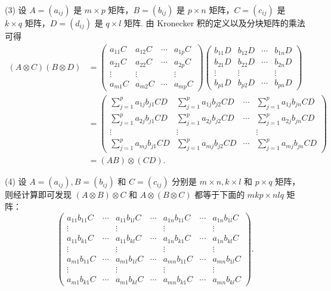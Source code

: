 \documentclass[UTF8,12pt,a4paper,fontset=fandol]{ctexart}
\begin{document}
(3) 设 $A=(a_{ij})$ 是 $m\times p$ 矩阵，$B=(b_{ij})$ 是 $p\times n$ 矩阵，$C=(c_{ij})$ 是 $k\times q$ 矩阵，$D=(d_{ij})$ 是 $q\times l$ 矩阵. 由 Kronecker 积的定义以及分块矩阵的乘法可得
\[
\begin{aligned}
(A\otimes C)(B\otimes D)
&=
\begin{pmatrix}
a_{11}C&a_{12}C&\cdots&a_{1p}C\\
a_{21}C&a_{22}C&\cdots&a_{2p}C\\
\vdots&\vdots&&\vdots\\
a_{m1}C&a_{m2}C&\cdots&a_{mp}C
\end{pmatrix}
\begin{pmatrix}
b_{11}D&b_{12}D&\cdots&b_{1n}D\\
b_{21}D&b_{22}D&\cdots&b_{2n}D\\
\vdots&\vdots&&\vdots\\
b_{p1}D&b_{p2}D&\cdots&b_{pn}D
\end{pmatrix}  \\
&=
\begin{pmatrix}
\sum_{j=1}^p a_{1j}b_{j1}CD&\sum_{j=1}^p a_{1j}b_{j2}CD&\cdots&\sum_{j=1}^p a_{1j}b_{jn}CD\\
\sum_{j=1}^p a_{2j}b_{j1}CD&\sum_{j=1}^p a_{2j}b_{j2}CD&\cdots&\sum_{j=1}^p a_{2j}b_{jn}CD\\
\vdots&\vdots&&\vdots\\
\sum_{j=1}^p a_{mj}b_{j1}CD&\sum_{j=1}^p a_{mj}b_{j2}CD&\cdots&\sum_{j=1}^p a_{mj}b_{jn}CD
\end{pmatrix}  \\
&=(AB)\otimes(CD).
\end{aligned}
\]

(4) 设 $A=(a_{ij}),B=(b_{ij})$ 和 $C=(c_{ij})$ 分别是 $m\times n,k\times l$ 和 $p\times q$ 矩阵，则经计算即可发现 $(A\otimes B)\otimes C$ 和 $A\otimes(B\otimes C)$ 都等于下面的 $mkp\times nlq$ 矩阵：
\[
\begin{pmatrix}
a_{11}b_{11}C&\cdots&a_{11}b_{1l}C&\cdots&a_{1n}b_{11}C&\cdots&a_{1n}b_{1l}C\\
\vdots&&\vdots&&\vdots&&\vdots\\
a_{11}b_{k1}C&\cdots&a_{11}b_{kl}C&\cdots&a_{1n}b_{k1}C&\cdots&a_{1n}b_{kl}C\\
\vdots&&\vdots&&\vdots&&\vdots\\
a_{m1}b_{11}C&\cdots&a_{m1}b_{1l}C&\cdots&a_{mn}b_{11}C&\cdots&a_{mn}b_{1l}C\\
\vdots&&\vdots&&\vdots&&\vdots\\
a_{m1}b_{k1}C&\cdots&a_{m1}b_{kl}C&\cdots&a_{mn}b_{k1}C&\cdots&a_{mn}b_{kl}C
\end{pmatrix}.
\]
\end{document}
